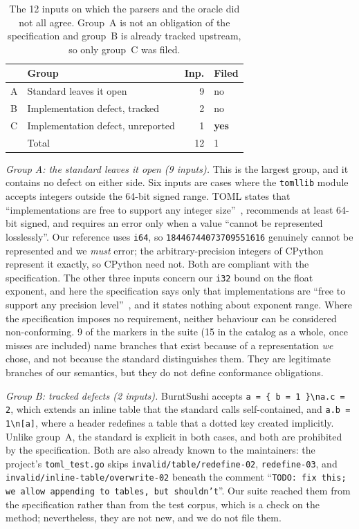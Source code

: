 \documentclass[sigconf,screen]{acmart}
\theoremstyle{definition}
\theoremstyle{remark}
\newcommand{\toml}{TOML}
\newcommand{\code}[1]{\texttt{#1}}
\newcommand{\divmarkers}{12}   %
\newcommand{\newbugcount}{1}   %
\newcommand{\specopen}{9}      %
\newcommand{\specopencat}{15}  %
\begin{document}
\begin{table}[t]
\caption{The \divmarkers{} inputs on which the parsers and the oracle did not
all agree. Group~A
is not an obligation of the specification and group~B is already tracked upstream, so
only group~C was filed.}
\label{tab:triage}
\small
\begin{tabular}{@{}llrl@{}}
\toprule
& Group & Inp. & Filed \\
\midrule
A & Standard leaves it open           & \specopen{} & no \\
B & Implementation defect, tracked    & 2 & no \\
C & Implementation defect, unreported & \newbugcount{} & \textbf{yes} \\
\midrule
  & Total                              & \divmarkers{} & \newbugcount{} \\
\bottomrule
\end{tabular}
\end{table}

\emph{Group A: the standard leaves it open (\specopen{} inputs).} This is the
largest group, and it contains no defect on either side. Six inputs are cases where the \code{tomllib} module accepts integers outside the 64-bit signed range.
\toml{} states that ``implementations are free to support any integer
size''~\cite{tomlspec}, recommends at least 64-bit signed, and requires an error
only when a value ``cannot be represented losslessly''. Our reference uses
\code{i64}, so \code{18446744073709551616} genuinely cannot be represented and
we \emph{must} error; the arbitrary-precision integers of CPython represent it
exactly, so CPython need not. Both are compliant with the specification. The other three inputs concern our
\code{i32} bound on the float exponent, and here the specification says only that implementations are ``free to support
any precision level''~\cite{tomlspec}, and it states nothing about exponent
range. Where the specification imposes no requirement, neither behaviour can be considered non-conforming. \specopen{} of the markers
in the suite (\specopencat{} in the catalog as a whole, once misses are
included) name branches that exist because of a representation \emph{we} chose,
and not because the standard distinguishes them. They are legitimate branches of our semantics, but they do not define conformance obligations.

\emph{Group B: tracked defects (2 inputs).} BurntSushi accepts
\code{a = \{ b = 1 \}\textbackslash{}na.c = 2}, which extends an inline table
that the standard calls self-contained, and \code{a.b = 1\textbackslash{}n[a]},
where a header redefines a table that a dotted key created implicitly. Unlike
group~A, the standard is explicit in both cases, and both are prohibited by the specification. Both are also already known to
the maintainers: the project's \code{toml\_test.go} skips
\code{invalid/table/redefine-02}, \code{redefine-03}, and
\code{invalid/inline-table/overwrite-02} beneath the comment ``\code{TODO: fix
this; we allow appending to tables, but shouldn't}''. Our suite reached them
from the specification rather than from the test corpus, which is a check on the
method; nevertheless, they are not new, and we do not file them.
\end{document}
